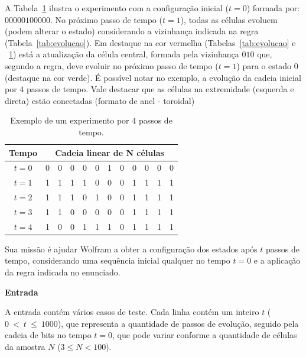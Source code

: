 A Tabela~\ref{tab:exemplo_evolucao} ilustra o experimento com a configuração inicial ($t = 0$) formada por: $00000100000$. No próximo passo de tempo ($t = 1$), todas as células evoluem (podem alterar o estado) considerando a vizinhança indicada na regra (Tabela~\ref{tab:evolucao}). Em destaque na cor vermelha (Tabelas~\ref{tab:evolucao} e ~\ref{tab:exemplo_evolucao}) está a atualização da célula central, formada pela vizinhança $010$ que, segundo a regra, deve evoluir no próximo passo de tempo ($t = 1$) para o estado $0$ (destaque na cor verde). É possível notar no exemplo, a evolução da cadeia inicial por $4$ passos de tempo. Vale destacar que as células na extremidade (esquerda e direta) estão conectadas (formato de anel - toroidal)

	\begin{table}[h!]
	\caption{Exemplo de um experimento por $4$ passos de tempo.}
	\label{tab:exemplo_evolucao}
	
	\centering
	\footnotesize{	
	\begin{tabular}{|c|c|c|c|c|c|c|c|c|c|c|c|}
		\hline
		Tempo & \multicolumn{11}{c|}{Cadeia linear de N células}\\ \hline
    	$t = 0$ & 0 & 0 & 0 & 0 & \cellcolor[HTML]{FFAAAA} 0 & \cellcolor[HTML]{FFAAAA} 1 & \cellcolor[HTML]{FFAAAA} 0 & 0 & 0 & 0 & 0 \\ \hline
		$t = 1$ & 1 & 1 & 1 & 1 &  0 & \cellcolor[HTML]{AAFFAA} 0 & 0 & 1 & 1 & 1 & 1 \\ \hline
		$t = 2$ & 1 & 1 & 1 & 0 &  1 & 0 & 0 & 1 & 1 & 1 & 1 \\ \hline
		$t = 3$ & 1 & 1 & 0 & 0 &  0 & 0 & 0 & 1 & 1 & 1 & 1 \\ \hline
		$t = 4$ & 1 & 0 & 0 & 1 &  1 & 1 & 0 & 1 & 1 & 1 & 1 \\ \hline
	\end{tabular}
	}	
\end{table}

Sua missão é ajudar Wolfram a obter a configuração dos estados após $t$ passos de tempo, considerando uma
sequência inicial qualquer no tempo $t = 0$ e a aplicação da regra indicada no enunciado.

\vspace{0.3cm}
\textbf{Entrada}

A entrada contém vários casos de teste. Cada linha contém um inteiro $t$ ($0~<~t~\leq~1000$), que representa
a quantidade de passos de evolução, seguido pela cadeia de bits no tempo $t = 0$, que pode variar conforme a
quantidade de células da amostra $N$ ($3 \leq N < 100$).

